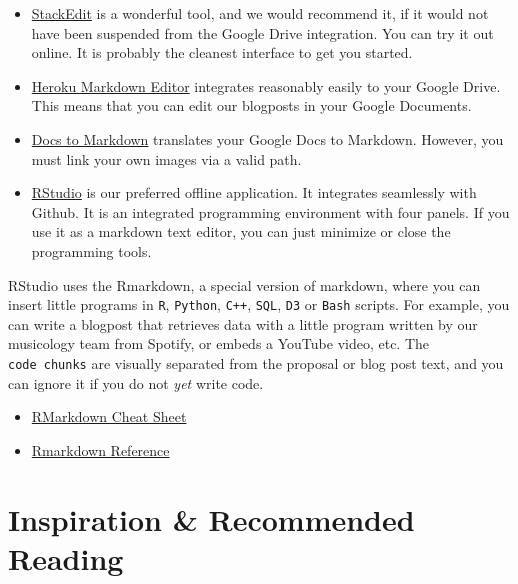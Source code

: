\documentclass[
  fontsize=13pt,
  english,
  a4paper,
  openany, a4paper, oneside]{book}
\providecommand{\tightlist}{%
  \setlength{\itemsep}{0pt}\setlength{\parskip}{0pt}}
\begin{document}
\begin{itemize}
\item
  \href{https://stackedit.io/}{StackEdit} is a wonderful tool, and we would recommend it, if it would not have been suspended from the Google Drive integration. You can try it out online. It is probably the cleanest interface to get you started.
\item
  \href{https://thumbsdb.herokuapp.com/markdown/}{Heroku Markdown Editor} integrates reasonably easily to your Google Drive. This means that you can edit our blogposts in your Google Documents.
\item
  \href{https://gsuite.google.com/marketplace/app/docs_to_markdown/700168918607}{Docs to Markdown} translates your Google Docs to Markdown. However, you must link your own images via a valid path.
\item
  \href{https://rstudio.com/}{RStudio} is our preferred offline application. It integrates seamlessly with Github. It is an integrated programming environment with four panels. If you use it as a markdown text editor, you can just minimize or close the programming tools.
\end{itemize}

RStudio uses the Rmarkdown, a special version of markdown, where you can insert little programs in \texttt{R}, \texttt{Python}, \texttt{C++}, \texttt{SQL}, \texttt{D3} or \texttt{Bash} scripts. For example, you can write a blogpost that retrieves data with a little program written by our musicology team from Spotify, or embeds a YouTube video, etc. The \texttt{code\ chunks} are visually separated from the proposal or blog post text, and you can ignore it if you do not \emph{yet} write code.

\begin{itemize}
\tightlist
\item
  \href{https://rstudio.com/wp-content/uploads/2016/03/rmarkdown-cheatsheet-2.0.pdf?_ga=2.126386957.1623649708.1603024238-59012930.1603024238}{RMarkdown Cheat Sheet}
\item
  \href{https://rstudio.com/wp-content/uploads/2015/03/rmarkdown-reference.pdf?_ga=2.68348561.1623649708.1603024238-59012930.1603024238}{Rmarkdown Reference}
\end{itemize}

\hypertarget{inspiration}{%
\section{Inspiration \& Recommended Reading}\label{inspiration}}
\end{document}
